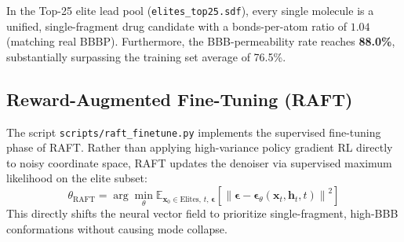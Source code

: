 \documentclass[11pt, a4paper]{article}
\begin{document}
\begin{table}[H]
\centering
\caption{Reward Selection Elite Pool Properties (\texttt{outputs/reward\_select\_v5}).}
\label{tab:elite_pools}
\end{table}

\begin{takeaway}
In the Top-25 elite lead pool (\texttt{elites\_top25.sdf}), every single molecule is a unified, single-fragment drug candidate with a bonds-per-atom ratio of $1.04$ (matching real BBBP). Furthermore, the BBB-permeability rate reaches \textbf{88.0\%}, substantially surpassing the training set average of 76.5\%.
\end{takeaway}

\subsection{Reward-Augmented Fine-Tuning (RAFT)}
The script \texttt{scripts/raft\_finetune.py} implements the supervised fine-tuning phase of RAFT. Rather than applying high-variance policy gradient RL directly to noisy coordinate space, RAFT updates the denoiser via supervised maximum likelihood on the elite subset:
\begin{equation}
\theta_{\text{RAFT}} = \arg\min_\theta \mathbb{E}_{\bm{x}_0 \in \text{Elites},\, t,\, \bm{\epsilon}}\left[ \left\| \bm{\epsilon} - \bm{\epsilon}_\theta(\bm{x}_t, \bm{h}_t, t) \right\|^2 \right]
\end{equation}
This directly shifts the neural vector field to prioritize single-fragment, high-BBB conformations without causing mode collapse.
\end{document}
